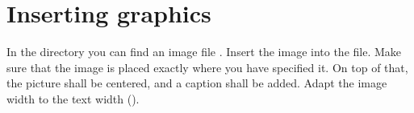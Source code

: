 \section{Inserting graphics}

In the  directory you can find an image file 
. Insert the image into the 
 file. Make sure that the image is placed 
exactly where you have specified it. On top of that, the picture shall be 
centered, and a caption shall be added. Adapt the image width to the text width 
().


